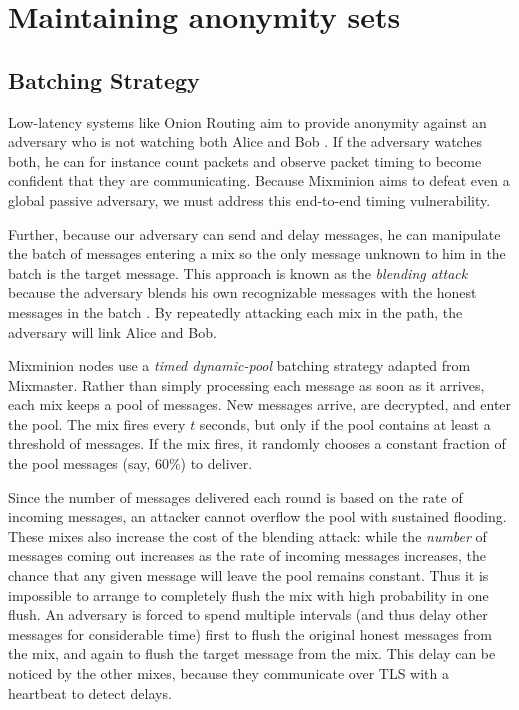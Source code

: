\documentclass[final,inpress,inline]{ieee}
\begin{document}

\section{Maintaining anonymity sets}
\label{sec:maintaining-anonymity}

\subsection{Batching Strategy}
\label{subsec:batching}

Low-latency systems like Onion Routing aim to provide anonymity against an
adversary who is not watching both Alice and Bob \cite{onion-routing}. If
the adversary watches both, he can for instance count packets and observe
packet timing to become confident that they are communicating. Because
Mixminion aims to defeat even a global passive adversary, we must address
this end-to-end timing vulnerability.

Further, because our adversary can send and delay messages,
he can manipulate the batch of messages entering a mix so the only message
unknown to him in the batch is the target message. This approach is
known as the \emph{blending attack} because the adversary blends his
own recognizable messages with the honest messages in the batch
\cite{batching-taxonomy}. By repeatedly
attacking each mix in the path, the adversary will link Alice and Bob.

Mixminion nodes use a \emph{timed dynamic-pool} batching strategy
\cite{batching-taxonomy} adapted from Mixmaster. Rather than simply
processing each message as soon as it arrives, each mix keeps a pool of
messages. New messages arrive, are decrypted, and enter the pool. The
mix fires every $t$ seconds, but only if the pool contains at least a
threshold of messages. If the mix fires, it randomly chooses a constant
fraction of the pool messages (say, 60\%) to deliver.

Since the number of messages delivered each round is based on the rate of
incoming messages, an attacker cannot overflow the pool with sustained
flooding. These mixes also increase the cost of the blending attack:
while the \emph{number} of messages coming out increases as the rate
of incoming messages increases, the chance that any given message will
leave the pool remains constant. Thus it is impossible to arrange to
completely flush the mix with high probability in one flush. An adversary
is forced to spend multiple intervals (and thus delay other messages
for considerable time) first to flush the original honest messages from
the mix, and again to flush the target message from the mix. This delay
can be noticed by the other mixes, because they communicate over TLS
with a heartbeat to detect delays.
\end{document}
